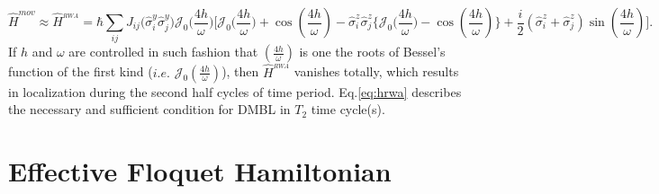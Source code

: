 \documentclass[%
nofootinbib,
reprint,
superscriptaddress,
amsmath,amssymb,showkeys,
aps,
prb,
]{revtex4-2}
\begin{document}
	\begin{equation}
		\hat{H}^{mov}\approx \hat{H}^{_{RWA}} = \hbar\sum_{ij} J_{ij} \Big(\hat{\sigma}^y_i\hat{\sigma}^y_j\Big) \mathcal{J}_0\Big(\frac{4h}{\omega}\Big)\Bigg[\mathcal{J}_0\Big(\frac{4h}{\omega}\Big) + \cos(\frac{4h}{\omega}) -\hat{\sigma}^z_i\hat{\sigma}^z_j \bigg\{\mathcal{J}_0\Big(\frac{4h}{\omega}\Big) - \cos(\frac{4h}{\omega})\bigg\} + \frac{i}{2} (\hat{\sigma}^z_i + \hat{\sigma}^z_j) \sin(\frac{4h}{\omega})\Bigg].
		\label{eq:hrwa}
	\end{equation}	
	If $h$ and $\omega$ are controlled in such fashion that $\left(\frac{4h}{\omega}\right)$ is one the roots of Bessel's function of the first kind (${i.e.}$ $\mathcal{J}_0\left(\frac{4h}{\omega}\right)$), then $\hat{H}^{_{RWA}}$ vanishes totally, which results in localization during the second half cycles of time period. Eq.\eqref{eq:hrwa} describes the necessary and sufficient condition for DMBL in $T_2$ time cycle(s). 
	
	\section{\label{sec:AppendixB} Effective Floquet Hamiltonian}
	
\end{document}
